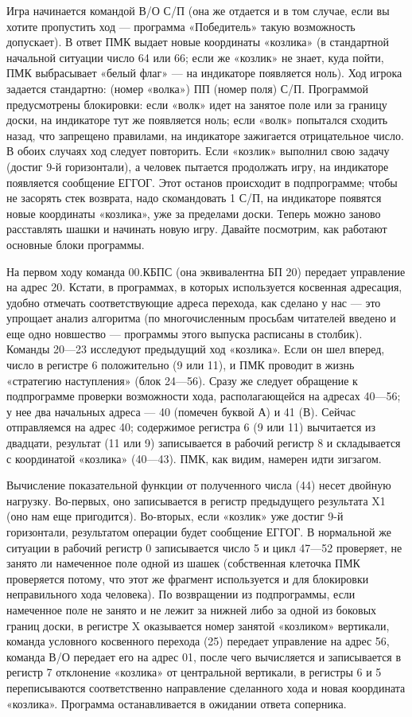 \documentclass[11pt,a4paper,oneside]{article}
\begin{document}
Игра начинается командой В/О С/П (она же отдается и в том случае, если вы хотите пропустить ход — программа «Победитель» такую возможность допускает). В ответ ПМК выдает новые координаты «козлика» (в стандартной начальной ситуации число 64 или 66; если же «козлик» не знает, куда пойти, ПМК выбрасывает «белый флаг» — на индикаторе появляется ноль). Ход игрока задается стандартно: (номер «волка») ПП (номер поля) С/П. Программой предусмотрены блокировки: если «волк» идет на занятое поле или за границу доски, на индикаторе тут же появляется ноль; если «волк» попытался сходить назад, что запрещено правилами, на индикаторе зажигается отрицательное число. В обоих случаях ход следует повторить. Если «козлик» выполнил свою задачу (достиг 9-й горизонтали), а человек пытается продолжать игру, на индикаторе появляется сообщение ЕГГОГ. Этот останов происходит в подпрограмме; чтобы не засорять стек возврата, надо скомандовать 1 С/П, на индикаторе появятся новые координаты «козлика», уже за пределами доски. Теперь  можно заново расставлять шашки и начинать новую игру. Давайте посмотрим, как работают основные блоки программы.

На первом ходу команда 00.КБПС (она эквивалентна БП 20) передает управление на адрес 20. Кстати, в программах, в которых используется косвенная адресация, удобно отмечать соответствующие адреса перехода, как сделано у нас — это упрощает анализ алгоритма (по многочисленным просьбам читателей введено и еще одно новшество — программы этого выпуска расписаны в столбик). Команды 20—23 исследуют предыдущий ход «козлика». Если он шел вперед, число в регистре 6 положительно (9 или 11), и ПМК проводит в жизнь «стратегию наступления» (блок 24—56). Сразу же следует обращение к подпрограмме проверки возможности хода, располагающейся на адресах 40—56; у нее два начальных адреса — 40 (помечен буквой А) и 41 (В). Сейчас отправляемся на адрес 40; содержимое регистра 6 (9 или 11) вычитается из двадцати, результат (11 или 9) записывается в рабочий регистр 8 и складывается с координатой «козлика» (40—43). ПМК, как видим, намерен идти зигзагом.

Вычисление показательной функции от полученного числа (44) несет двойную нагрузку. Во-первых, оно записывается в регистр предыдущего результата X1 (оно нам еще пригодится). Во-вторых, если «козлик» уже достиг 9-й горизонтали, результатом операции будет сообщение ЕГГОГ. В нормальной же ситуации в рабочий регистр 0 записывается число 5 и цикл 47—52 проверяет, не занято ли намеченное поле одной из шашек (собственная клеточка ПМК проверяется потому, что этот же фрагмент используется и для блокировки неправильного хода человека). По возвращении из подпрограммы, если намеченное поле не занято и не лежит за нижней либо за одной из боковых границ доски, в регистре X оказывается номер занятой «козликом» вертикали, команда условного косвенного перехода (25) передает управление на адрес 56, команда В/О передает его на адрес 01, после чего вычисляется и записывается в регистр 7 отклонение «козлика» от центральной вертикали, в регистры 6 и 5 переписываются соответственно направление сделанного хода и новая координата «козлика». Программа останавливается в ожидании ответа соперника.
\end{document}

